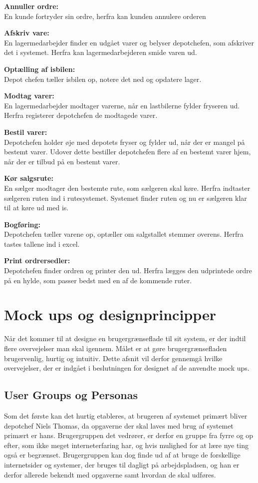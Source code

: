 \textbf{Annuller ordre:} \\
En kunde fortryder sin ordre, herfra kan kunden annulere orderen

\textbf{Afskriv vare:} \\
En lagermedarbejder finder en udgået varer og belyser depotchefen, som afskriver det i systemet. Herfra kan lagermedarbejderen smide varen ud. 

\textbf{Optælling af isbilen:} \\
Depot chefen tæller isbilen op, notere det ned og opdatere lager. 

\textbf{Modtag varer:} \\
En lagermedarbejder modtager varerne, når en lastbilerne fylder fryseren ud. Herfra registerer depotchefen de modtagede varer. 

\textbf{Bestil varer:} \\
Depotchefen holder øje med depotets fryser og fylder ud, når der er mangel på bestemt varer. Udover dette bestiller depotchefen flere af en bestemt varer hjem, når der er tilbud på en bestemt varer. 

\textbf{Kør salgsrute:} \\
En sælger modtager den bestemte rute, som sælgeren skal køre. Herfra indtaster sælgeren ruten ind i rutesystemet. Systemet finder ruten og nu er sælgeren klar til at køre ud med is. 

\textbf{Bogføring:} \\
Depotchefen tæller varene op, optæller om salgstallet stemmer overens. Herfra tastes tallene ind i excel. 

\textbf{Print ordrersedler:} \\
Depotchefen finder ordren og printer den ud. Herfra lægges den udprintede ordre på en hylde, som passer bedst med en af de kommende ruter.

\section{Mock ups og designprincipper}
Når det kommer til at designe en brugergrænseflade til sit system, er der indtil flere overvejelser man skal igennem. Målet er at gøre brugergrænsefladen brugervenlig, hurtig og intuitiv. Dette afsnit vil derfor gennemgå hvilke overvejelser, der er indgået i beslutningen for designet af de anvendte mock ups.

\subsection{User Groups og Personas}
Som det første kan det hurtig etableres, at brugeren af systemet primært bliver depotchef Niels Thomas, da opgaverne der skal laves med brug af systemet primært er hans. Brugergruppen det vedrører, er derfor en gruppe fra fyrre og op efter, som ikke meget interneterfaring har, og hvis mulighed for at lære nye ting også er begrænset. Brugergruppen kan dog finde ud af at bruge de forskellige internetsider og systemer, der bruges til dagligt på arbejdspladsen, og han er derfor allerede bekendt med opgaverne samt hvordan de skal udføres. 

